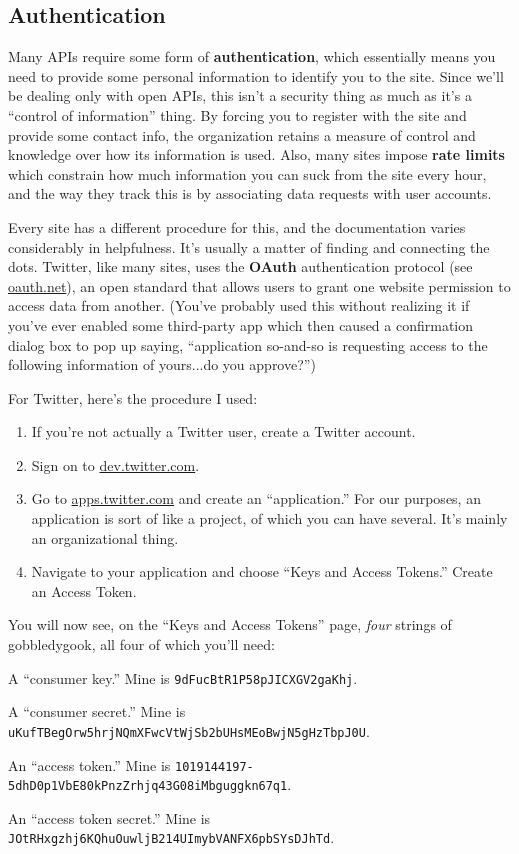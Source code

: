 \subsection{Authentication}

Many APIs require some form of \textbf{authentication}, which essentially
means you need to provide some personal information to identify you to the
site. Since we'll be dealing only with open APIs, this isn't a security thing
as much as it's a ``control of information'' thing. By forcing you to register
with the site and provide some contact info, the organization retains a
measure of control and knowledge over how its information is used. Also, many
sites impose \textbf{rate limits} which constrain how much information you can
suck from the site every hour, and the way they track this is by associating
data requests with user accounts.

Every site has a different procedure for this, and the documentation varies
considerably in helpfulness. It's usually a matter of finding and connecting
the dots. Twitter, like many sites, uses the \textbf{OAuth} authentication
protocol (see \url{oauth.net}), an open standard that allows users to grant
one website permission to access data from another. (You've probably used this
without realizing it if you've ever enabled some third-party app which then
caused a confirmation dialog box to pop up saying, ``application so-and-so is
requesting access to the following information of yours...do you approve?'')

For Twitter, here's the procedure I used:

\begin{enumerate}
\itemsep.1em
\item If you're not actually a Twitter user, create a Twitter account.
\item Sign on to \url{dev.twitter.com}.
\item Go to \url{apps.twitter.com} and create an ``application.'' For our
purposes, an application is sort of like a project, of which you can have
several. It's mainly an organizational thing.
\item Navigate to your application and choose ``Keys and Access Tokens.''
Create an Access Token.
\end{enumerate}

You will now see, on the ``Keys and Access Tokens'' page, \textit{four} strings
of gobbledygook, all four of which you'll need:

\vspace{.1in}
\small
\begin{compactitem}
\item A ``consumer key.'' Mine is \texttt{9dFucBtR1P58pJICXGV2gaKhj}.
\item A ``consumer secret.'' Mine is
\texttt{uKufTBegOrw5hrjNQmXFwcVtWjSb2bUHsMEoBwjN5gHzTbpJ0U}.
\item An ``access token.'' Mine is
\texttt{1019144197-5dhD0p1VbE80kPnzZrhjq43G08iMbguggkn67q1}.
\item An ``access token secret.'' Mine is
\texttt{JOtRHxgzhj6KQhuOuwljB214UImybVANFX6pbSYsDJhTd}.
\end{compactitem}
\normalsize
\vspace{.1in}

